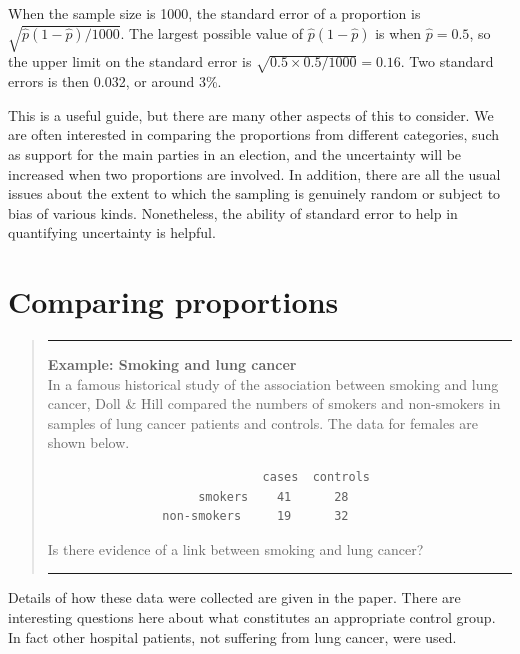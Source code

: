 \documentclass[
]{book}
\begin{document}
When the sample size is 1000, the standard error of a proportion is \(\sqrt{\hat{p}(1-\hat{p})/1000}\). The largest possible value of \(\hat{p}(1-\hat{p})\) is when \(\hat{p} = 0.5\), so the upper limit on the standard error is \(\sqrt{0.5 \times 0.5 / 1000} = 0.16\). Two standard errors is then 0.032, or around 3\%.

This is a useful guide, but there are many other aspects of this to consider. We are often interested in comparing the proportions from different categories, such as support for the main parties in an election, and the uncertainty will be increased when two proportions are involved. In addition, there are all the usual issues about the extent to which the sampling is genuinely random or subject to bias of various kinds. Nonetheless, the ability of standard error to help in quantifying uncertainty is helpful.

\section{Comparing proportions}\label{comparing-proportions}

\begin{quote}
\begin{center}\rule{0.5\linewidth}{0.5pt}\end{center}

\textbf{Example: Smoking and lung cancer}\\
In a famous historical study of the association between smoking and lung cancer, Doll \& Hill compared the numbers of smokers and non-smokers in samples of lung cancer patients and controls. The data for females are shown below.

\begin{verbatim}
                              cases  controls
                     smokers    41      28
                non-smokers     19      32
\end{verbatim}

Is there evidence of a link between smoking and lung cancer?

\begin{center}\rule{0.5\linewidth}{0.5pt}\end{center}
\end{quote}

Details of how these data were collected are given in the paper. There are interesting questions here about what constitutes an appropriate control group. In fact other hospital patients, not suffering from lung cancer, were used.
\end{document}
